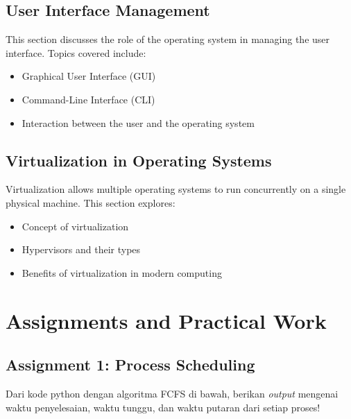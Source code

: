 \documentclass[12pt]{article}
\begin{document}
\subsection{User Interface Management}
This section discusses the role of the operating system in managing the user interface. Topics covered include:
\begin{itemize}
    \item Graphical User Interface (GUI)
    \item Command-Line Interface (CLI)
    \item Interaction between the user and the operating system
\end{itemize}

\subsection{Virtualization in Operating Systems}
Virtualization allows multiple operating systems to run concurrently on a single physical machine. This section explores:
\begin{itemize}
    \item Concept of virtualization
    \item Hypervisors and their types
    \item Benefits of virtualization in modern computing
\end{itemize}

\section{Assignments and Practical Work}
\subsection{Assignment 1: Process Scheduling}
Dari kode python dengan algoritma FCFS di bawah, berikan \textit{output} mengenai waktu penyelesaian, waktu tunggu, dan waktu putaran dari setiap proses!
\end{document}
